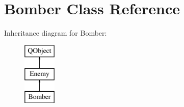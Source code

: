 \hypertarget{class_bomber}{\section{Bomber Class Reference}
\label{class_bomber}
}
Inheritance diagram for Bomber\-:\begin{figure}[H]
\begin{center}
\leavevmode
\includegraphics[height=3.000000cm]{class_bomber}
\end{center}
\end{figure}
